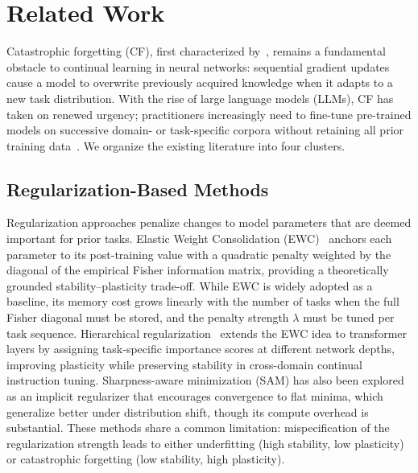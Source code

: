 \section{Related Work}
\label{sec:related}

Catastrophic forgetting (CF), first characterized by~\cite{mccloskey1989catastrophic}, remains a
fundamental obstacle to continual learning in neural networks: sequential gradient updates cause a
model to overwrite previously acquired knowledge when it adapts to a new task distribution.
With the rise of large language models (LLMs), CF has taken on renewed urgency; practitioners
increasingly need to fine-tune pre-trained models on successive domain- or task-specific corpora
without retaining all prior training data~\cite{luo2023empirical,li2024revisiting}.
We organize the existing literature into four clusters.


\subsection{Regularization-Based Methods}

Regularization approaches penalize changes to model parameters that are deemed important for prior
tasks.
Elastic Weight Consolidation (EWC)~\cite{kirkpatrick2017overcoming} anchors each parameter to its
post-training value with a quadratic penalty weighted by the diagonal of the empirical Fisher
information matrix, providing a theoretically grounded stability--plasticity trade-off.
While EWC is widely adopted as a baseline, its memory cost grows linearly with the number of tasks
when the full Fisher diagonal must be stored, and the penalty strength $\lambda$ must be tuned
per task sequence.
Hierarchical regularization~\cite{song2025hierarchical} extends the EWC idea to transformer layers
by assigning task-specific importance scores at different network depths, improving plasticity while
preserving stability in cross-domain continual instruction tuning.
Sharpness-aware minimization (SAM) has also been explored as an implicit regularizer that encourages
convergence to flat minima, which generalize better under distribution shift, though its compute
overhead is substantial.
These methods share a common limitation: mispecification of the regularization strength leads to
either underfitting (high stability, low plasticity) or catastrophic forgetting (low stability,
high plasticity).

